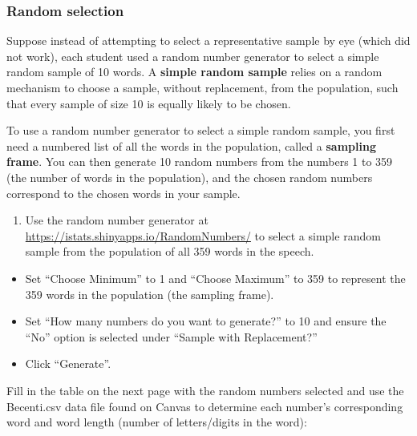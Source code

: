 \documentclass[
]{report}
\providecommand{\tightlist}{%
  \setlength{\itemsep}{0pt}\setlength{\parskip}{0pt}}
\begin{document}
\subsubsection*{Random selection}\label{random-selection}

Suppose instead of attempting to select a representative sample by eye (which did not work), each student used a random number generator to select a simple random sample of 10 words. A \textbf{simple random sample} relies on a random mechanism to choose a sample, without replacement, from the population, such that every sample of size 10 is equally likely to be chosen.

To use a random number generator to select a simple random sample, you first need a numbered list of all the words in the population, called a \textbf{sampling frame}. You can then generate 10 random numbers from the numbers 1 to 359 (the number of words in the population), and the chosen random numbers correspond to the chosen words in your sample.

\begin{enumerate}
\def\labelenumi{\arabic{enumi}.}
\setcounter{enumi}{4}
\tightlist
\item
  Use the random number generator at \url{https://istats.shinyapps.io/RandomNumbers/} to select a simple random sample from the population of all 359 words in the speech.
\end{enumerate}

\begin{itemize}
\item
  Set ``Choose Minimum'' to 1 and ``Choose Maximum'' to 359 to represent the 359 words in the population (the sampling frame).
\item
  Set ``How many numbers do you want to generate?'' to 10 and ensure the ``No'' option is selected under ``Sample with Replacement?''
\item
  Click ``Generate''.
\end{itemize}

Fill in the table on the next page with the random numbers selected and use the Becenti.csv data file found on Canvas to determine each number's corresponding word and word length (number of letters/digits in the word):
\end{document}
